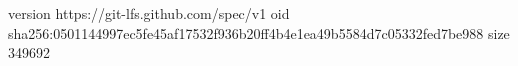 version https://git-lfs.github.com/spec/v1
oid sha256:0501144997ec5fe45af17532f936b20ff4b4e1ea49b5584d7c05332fed7be988
size 349692
